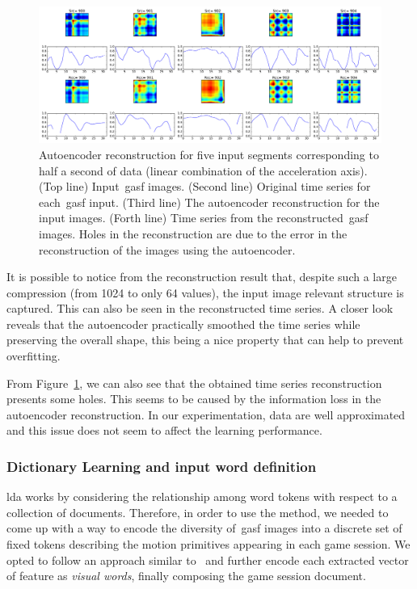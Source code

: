 \begin{figure}[h]
	\centering
	\includegraphics[width=\textwidth]{images/05-modeling/reconstructions}
	\caption{Autoencoder reconstruction for five input segments corresponding to half a second of data (linear combination of the acceleration axis). ({Top line}) Input~\gls{gasf} images. ({Second line}) Original time series for each~\gls{gasf} input. ({Third line}) The autoencoder reconstruction for the input images. ({Forth line}) Time series from the reconstructed~\gls{gasf} images. Holes in the reconstruction are due to the error in the reconstruction of the images using the autoencoder.}
  \label{fig:reconstruction}
\end{figure}

It is possible to notice from the reconstruction result that, despite such a large compression (from 1024 to only 64 values), the input image relevant structure is captured. This can also be seen in the reconstructed time series. A closer look reveals that the autoencoder practically smoothed the time series while preserving the overall shape, this being a nice property that can help to prevent overfitting.

From Figure~\ref{fig:reconstruction}, we can also see that the obtained time series reconstruction presents some holes. This seems to be caused by the information loss in the autoencoder reconstruction. In our experimentation, data are well approximated and this issue does not seem to affect the learning performance.

\subsubsection{Dictionary Learning and input word definition}
\glsdesc{lda} works by considering the relationship among word tokens with respect to a collection of documents. Therefore, in order to use the method, we needed to come up with a way to encode the diversity of~\gls{gasf} images into a discrete set of fixed tokens describing the motion primitives appearing in each game session. We opted to follow an approach similar to~\cite{prince_computer_2012} and further encode each extracted vector of feature as \textit{visual words}, finally composing the game session document. 

